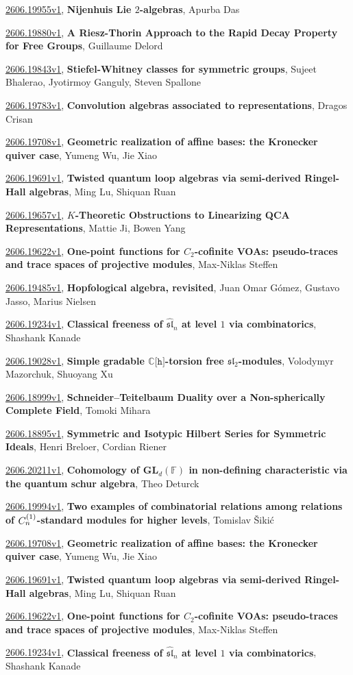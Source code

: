 \documentclass[9pt, a4paper]{article}
\theoremstyle{plain}
\theoremstyle{definition}
\theoremstyle{remark}
\newcommand{\arxiv}[3]{\href{https://arxiv.org/abs/#1}{#1}, \textbf{\textcolor{arxivblue}{#2}}, #3}
\begin{document}
\arxiv{2606.19955v1}{Nijenhuis Lie $2$-algebras}{Apurba Das}

\arxiv{2606.19880v1}{A Riesz-Thorin Approach to the Rapid Decay Property for Free Groups}{Guillaume Delord}

\arxiv{2606.19843v1}{Stiefel-Whitney classes for symmetric groups}{Sujeet Bhalerao, Jyotirmoy Ganguly, Steven Spallone}

\arxiv{2606.19783v1}{Convolution algebras associated to representations}{Dragos Crisan}

\arxiv{2606.19708v1}{Geometric realization of affine bases: the Kronecker quiver case}{Yumeng Wu, Jie Xiao}

\arxiv{2606.19691v1}{Twisted quantum loop algebras via semi-derived Ringel-Hall algebras}{Ming Lu, Shiquan Ruan}

\arxiv{2606.19657v1}{$K$-Theoretic Obstructions to Linearizing QCA Representations}{Mattie Ji, Bowen Yang}

\arxiv{2606.19622v1}{One-point functions for $C_2$-cofinite VOAs: pseudo-traces and trace spaces of projective modules}{Max-Niklas Steffen}

\arxiv{2606.19485v1}{Hopfological algebra, revisited}{Juan Omar Gómez, Gustavo Jasso, Marius Nielsen}

\arxiv{2606.19234v1}{Classical freeness of $\widehat{\mathfrak{sl}}_n$ at level $1$ via combinatorics}{Shashank Kanade}

\arxiv{2606.19028v1}{Simple gradable $\mathbb{C}\lbrack\mathtt{h}\rbrack$-torsion free $\mathfrak{sl}_2$-modules}{Volodymyr Mazorchuk, Shuoyang Xu}

\arxiv{2606.18999v1}{Schneider--Teitelbaum Duality over a Non-spherically Complete Field}{Tomoki Mihara}

\arxiv{2606.18895v1}{Symmetric and Isotypic Hilbert Series for Symmetric Ideals}{Henri Breloer, Cordian Riener}

\arxiv{2606.20211v1}{Cohomology of $\mathbf{GL}_d(\mathbb{F})$ in non-defining characteristic via the quantum schur algebra}{Theo Deturck}

\arxiv{2606.19994v1}{Two examples of combinatorial relations among relations of $C_{n}\sp{(1)}$-standard modules for higher levels}{Tomislav Šiki\' c}

\arxiv{2606.19708v1}{Geometric realization of affine bases: the Kronecker quiver case}{Yumeng Wu, Jie Xiao}

\arxiv{2606.19691v1}{Twisted quantum loop algebras via semi-derived Ringel-Hall algebras}{Ming Lu, Shiquan Ruan}

\arxiv{2606.19622v1}{One-point functions for $C_2$-cofinite VOAs: pseudo-traces and trace spaces of projective modules}{Max-Niklas Steffen}

\arxiv{2606.19234v1}{Classical freeness of $\widehat{\mathfrak{sl}}_n$ at level $1$ via combinatorics}{Shashank Kanade}

\end{document}
